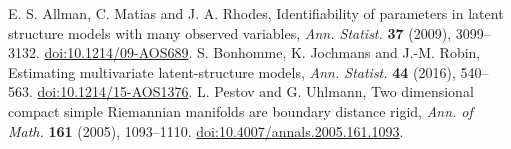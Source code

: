 E. S. Allman, C. Matias and J. A. Rhodes,
Identifiability of parameters in latent structure models with many observed variables,
\emph{Ann. Statist.} \textbf{37} (2009), 3099--3132.
\href{https://doi.org/10.1214/09-AOS689}{doi:10.1214/09-AOS689}.
S. Bonhomme, K. Jochmans and J.-M. Robin,
Estimating multivariate latent-structure models,
\emph{Ann. Statist.} \textbf{44} (2016), 540--563.
\href{https://doi.org/10.1214/15-AOS1376}{doi:10.1214/15-AOS1376}.
L. Pestov and G. Uhlmann,
Two dimensional compact simple Riemannian manifolds are boundary distance rigid,
\emph{Ann. of Math.} \textbf{161} (2005), 1093--1110.
\href{https://doi.org/10.4007/annals.2005.161.1093}{doi:10.4007/annals.2005.161.1093}.
